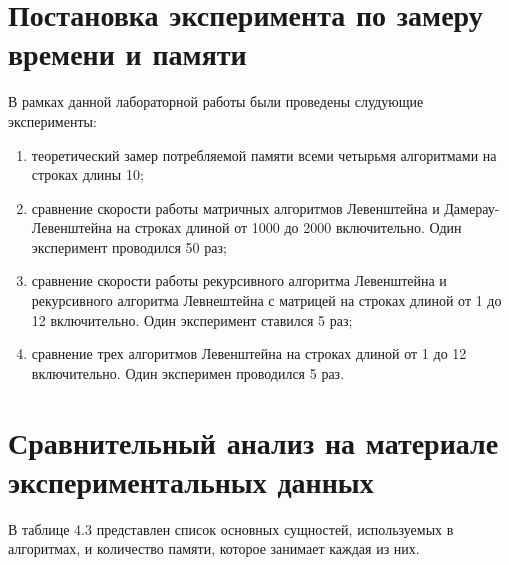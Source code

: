 \documentclass[12pt,a4paper,oneside]{report}
\begin{document}
\section{Постановка эксперимента по замеру времени и памяти}
\qquad В рамках данной лабораторной работы были проведены слудующие эксперименты:
\begin{enumerate}
	\item теоретический замер потребляемой памяти всеми четырьмя алгоритмами на строках длины 10;
	\item сравнение скорости работы матричных алгоритмов Левенштейна и Дамерау-Левенштейна на строках длиной от 1000 до 2000 включительно. Один эксперимент проводился 50 раз;
	\item сравнение скорости работы рекурсивного алгоритма Левенштейна и рекурсивного алгоритма Левнештейна с матрицей на строках длиной от 1 до 12 включительно. Один эксперимент ставился 5 раз;
	\item сравнение трех алгоритмов Левенштейна на строках длиной от 1 до 12 включительно. Один эксперимен проводился 5 раз.
\end{enumerate}
\newpage
\section{Сравнительный анализ на материале экспериментальных данных}

\qquad В таблице 4.3 представлен список основных сущностей, используемых в алгоритмах, и количество памяти, которое занимает каждая из них. 
\end{document}
